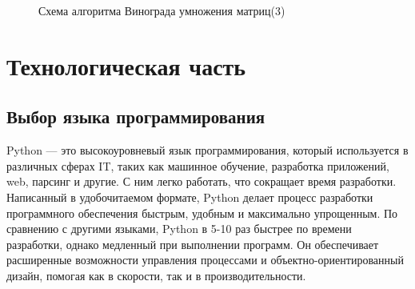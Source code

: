 \documentclass[a4paper]{article}
\begin{document}
\begin{figure}[h]
	\caption{Схема алгоритма Винограда умножения матриц(3)\centering}
	\label{image6}
\end{figure}
\clearpage
 \section{Технологическая часть}
 \subsection{Выбор языка программирования}
 Python\cite{what_is_python} — это высокоуровневый язык программирования, который используется в различных сферах IT, таких как машинное обучение, разработка приложений, web, парсинг и другие.
 С ним легко работать, что сокращает время разработки. Написанный в удобочитаемом формате, Python делает процесс разработки программного обеспечения быстрым, удобным и максимально упрощенным.
 По сравнению с другими языками, Python в 5-10 раз быстрее по времени разработки, однако медленный при выполнении программ. Он обеспечивает расширенные возможности управления процессами и объектно-ориентированный дизайн, помогая как в скорости, так и в производительности.
 \clearpage
 
\end{document}
